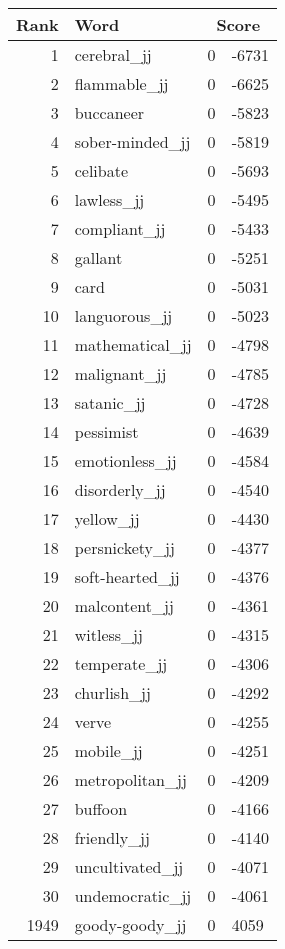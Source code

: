 \begin{longtable}[!htbp]{| rlr@{.}l |}
    \hline
    \textbf{Rank} & \textbf{Word} & \multicolumn{2}{c|}{\textbf{Score}} \\
    \hline
    \endhead
    1 & cerebral\_jj & 0 & -6731 \\
    2 & flammable\_jj & 0 & -6625 \\
    3 & buccaneer & 0 & -5823 \\
    4 & sober-minded\_jj & 0 & -5819 \\
    5 & celibate & 0 & -5693 \\
    6 & lawless\_jj & 0 & -5495 \\
    7 & compliant\_jj & 0 & -5433 \\
    8 & gallant & 0 & -5251 \\
    9 & card & 0 & -5031 \\
    10 & languorous\_jj & 0 & -5023 \\
    11 & mathematical\_jj & 0 & -4798 \\
    12 & malignant\_jj & 0 & -4785 \\
    13 & satanic\_jj & 0 & -4728 \\
    14 & pessimist & 0 & -4639 \\
    15 & emotionless\_jj & 0 & -4584 \\
    16 & disorderly\_jj & 0 & -4540 \\
    17 & yellow\_jj & 0 & -4430 \\
    18 & persnickety\_jj & 0 & -4377 \\
    19 & soft-hearted\_jj & 0 & -4376 \\
    20 & malcontent\_jj & 0 & -4361 \\
    21 & witless\_jj & 0 & -4315 \\
    22 & temperate\_jj & 0 & -4306 \\
    23 & churlish\_jj & 0 & -4292 \\
    24 & verve & 0 & -4255 \\
    25 & mobile\_jj & 0 & -4251 \\
    26 & metropolitan\_jj & 0 & -4209 \\
    27 & buffoon & 0 & -4166 \\
    28 & friendly\_jj & 0 & -4140 \\
    29 & uncultivated\_jj & 0 & -4071 \\
    30 & undemocratic\_jj & 0 & -4061 \\
    1949 & goody-goody\_jj & 0 & 4059 \\

\end{longtable}
